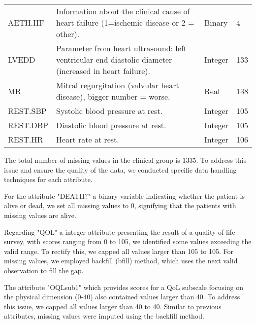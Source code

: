 \begin{table}[H]
\begin{adjustbox}{center}
\begin{tabular}{|p{2cm}|p{10cm}|p{1.8cm}|p{1.8cm}|}
                AETH.HF           & Information about the clinical cause of heart failure (1=ischemic disease or 2 = other).               & Binary             & 4                       \\
                LVEDD             & Parameter from heart ultrasound: left ventricular end diastolic diameter (increased in heart failure). & Integer            & 133                     \\
                MR                & Mitral regurgitation (valvular heart disease), bigger number = worse.                                  & Real               & 138                     \\
                REST.SBP          & Systolic blood pressure at rest.                                                                       & Integer            & 105                     \\
                REST.DBP          & Diastolic blood pressure at rest.                                                                      & Integer            & 105                     \\
                REST.HR           & Heart rate at rest.                                                                                    & Integer            & 106                     \\ \hline
            \end{tabular}
            \end{adjustbox}
        \end{table}
        
        The total number of missing values in the clinical group is 1335. To address this issue and ensure the quality of the data, we conducted specific data handling techniques for each attribute.
        
        For the attribute "DEATH?" a binary variable indicating whether the patient is alive or dead, we set all missing values to 0, signifying that the patients with missing values are alive.
        
        Regarding "QOL" a integer attribute presenting the result of a quality of life survey, with scores ranging from 0 to 105, we identified some values exceeding the valid range. To rectify this, we capped all values larger than 105 to 105. For missing values, we employed backfill (bfill) method, which uses the next valid observation to fill the gap.
        
        The attribute "OQLsub1" which provides scores for a QoL subscale focusing on the physical dimension (0-40) also contained values larger than 40. To address this issue, we capped all values larger than 40 to 40. Similar to previous attributes, missing values were imputed using the backfill method.
        
